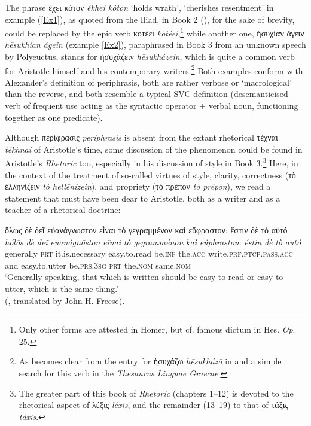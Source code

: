 \documentclass[output=paper,colorlinks,citecolor=brown]{langscibook}
\begin{document}
The phrase ἔχει κότον \textit{ékhei kóton} ‘holds wrath’, ‘cherishes resentment’ in example (\ref{Ex1}), as quoted from the Iliad, in Book 2 (), for the sake of brevity, could be replaced by the epic verb κοτέει \textit{kotéei},\footnote{ Only other forms are attested in Homer, but cf. famous dictum in Hes. \textit{Op}. 25.} while another one, ἡσυχίαν ἄγειν \textit{hēsukhían ágein} (example \ref{Ex2}), paraphrased in Book 3 from an unknown speech by Polyeuctus, stands for ἡσυχάζειν \textit{hēsukházein}, which is quite a common verb for Aristotle himself and his contemporary writers.\footnote{As becomes clear from the entry for ἡσυχάζω \textit{hēsukházō} in \citet{Liddell-Scott-Jones1996} and a simple search for this verb in the \textit{Thesaurus Linguae Graecae}.} Both examples conform with Alexander’s definition of periphrasis, both are rather verbose or ‘macrological’ than the reverse, and both resemble a typical SVC definition (desemanticised verb of frequent use acting as the syntactic operator + verbal noun, functioning together as one predicate).

Although περίφρασις \textit{períphrasis} is absent from the extant rhetorical τέχναι \textit{tékhnai} of Aristotle’s time, some discussion of the phenomenon could be found in Aristotle’s \textit{Rhetoric} too, especially in his discussion of style in Book 3.\footnote{The greater part of this book of \textit{Rhetoric} (chapters 1--12) is devoted to the rhetorical aspect of λέξις \textit{léxis}, and the remainder (13--19) to that of τάξις \textit{táxis}.} Here, in the context of the treatment of so-called virtues of style, clarity, correctness (τὸ ἑλληνίζειν \textit{tò hellēnízein}), and propriety (τὸ πρέπον \textit{tò prépon}), we read a statement that must have been dear to Aristotle, both as a writer and as a teacher of a rhetorical doctrine:

\ea\label{Ex3}
    \glll ὅλως δὲ δεῖ εὐανάγνωστον εἶναι τὸ γεγραμμένον καὶ εὔφραστον: ἔστιν δὲ τὸ αὐτό \\ 
    \textit{hólōs} \textit{dè} \textit{deĩ} \textit{euanágnōston} \textit{eĩnai} \textit{tò} \textit{gegramménon} \textit{kaì} \textit{eúphraston}: \textit{éstin} \textit{dè} \textit{tò} \textit{autó} \\
    generally \textsc{prt} it.is.necessary easy.to.read be.\textsc{inf} the.\textsc{acc} write.\textsc{prf.ptcp.pass.acc} and easy.to.utter be.\textsc{prs.3sg} \textsc{prt} the.\textsc{nom} same.\textsc{nom}\\
    \glt ‘Generally speaking, that which is written should be easy to read or easy to utter, which is the same thing.' \\
    \hspace*{\fill}(, translated by John H. Freese). 
\z
\end{document}
